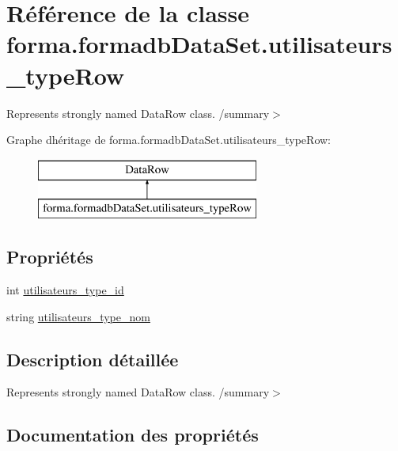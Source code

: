 \hypertarget{classforma_1_1formadb_data_set_1_1utilisateurs__type_row}{}\section{Référence de la classe forma.\+formadb\+Data\+Set.\+utilisateurs\+\_\+type\+Row}
\label{classforma_1_1formadb_data_set_1_1utilisateurs__type_row}


Represents strongly named Data\+Row class. /summary$>$  


Graphe d\textquotesingle{}héritage de forma.\+formadb\+Data\+Set.\+utilisateurs\+\_\+type\+Row\+:\begin{figure}[H]
\begin{center}
\leavevmode
\includegraphics[height=2.000000cm]{classforma_1_1formadb_data_set_1_1utilisateurs__type_row}
\end{center}
\end{figure}
\subsection*{Propriétés}
\begin{DoxyCompactItemize}
\item 
int \hyperlink{classforma_1_1formadb_data_set_1_1utilisateurs__type_row_a46cdf2406a5d6b0230d1fdc17cd940a4}{utilisateurs\+\_\+type\+\_\+id}
\item 
string \hyperlink{classforma_1_1formadb_data_set_1_1utilisateurs__type_row_ad4c3b42c3f5b7f0fa98f771551eb8d48}{utilisateurs\+\_\+type\+\_\+nom}
\end{DoxyCompactItemize}


\subsection{Description détaillée}
Represents strongly named Data\+Row class. /summary$>$ 

\subsection{Documentation des propriétés}
